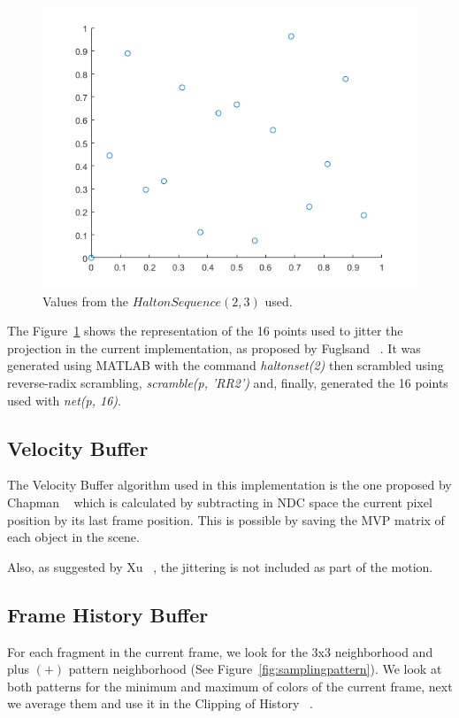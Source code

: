 \documentclass{cslthse-msc}
\begin{document}
\begin{figure}[!hbt]
	\centering
	\includegraphics[scale=0.5]{images/halton_16.png}
	\caption{Values from the $Halton Sequence (2,3)$ used.}\label{fig:halton16}
\end{figure}

The Figure~\ref{fig:halton16} shows the representation of the 16 points used to jitter the projection in the current implementation, as proposed by Fuglsand ~\cite{Fuglsand2016}. It was generated using MATLAB with the command \emph{haltonset(2)} then scrambled using reverse-radix scrambling, \emph{scramble(p, 'RR2')} and, finally, generated the 16 points used with \emph{net(p, 16)}.

\subsection{Velocity Buffer}
The Velocity Buffer algorithm used in this implementation is the one proposed by Chapman ~\cite{Chapman2012} which is calculated by subtracting in NDC space the current pixel position by its last frame position. This is possible by saving the MVP matrix of each object in the scene.

Also, as suggested by Xu ~\cite{XU2016}, the jittering is not included as part of the motion.


\subsection{Frame History Buffer}
For each fragment in the current frame, we look for the 3x3 neighborhood and plus $(+)$ pattern neighborhood (See Figure~\ref{fig:samplingpattern}). We look at both patterns for the minimum and maximum of colors of the current frame, next we average them and use it in the Clipping of History ~\cite{Fuglsand2016}.
\end{document}

